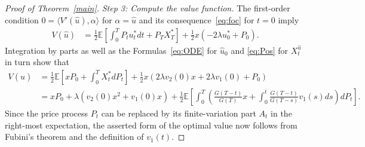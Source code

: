 \documentclass[11pt]{article}
\theoremstyle{definition}
\theoremstyle{remark}
\newcommand{\E}{\mathbb{E}} %
\newcommand{\ts}{\textstyle}
\begin{document}
\begin{proof}[Proof of Theorem~\ref{main}]
\emph{Step 3: Compute the value function.}
The first-order condition $0=\langle V'(\hat{u}), \alpha \rangle$ for $\alpha=\hat{u}$ and its consequence~\eqref{eq:foc} for $t=0$ imply
\begin{align*}
V(\hat{u}) &= \frac{1}{2}\E\left[\int_0^T P_t u^\ast_t dt + P_T X^\ast_T \right] + \frac{1}{2}x(-2\lambda u^\ast_0 + P_0).
\end{align*}
Integration by parts as well as the Formulas~\eqref{eq:ODE} for $\hat{u}_0$ and \eqref{eq:Pos} for $X^{\hat{u}}_t$ in turn show that
\begin{align*}
V(\hat{u}) &=\frac{1}{2}\E\left[xP_0 + \int_0^T X^\ast_t dP_t \right] + \frac{1}{2}x(2\lambda v_2(0)x + 2\lambda v_1(0) + P_0)\\
&= xP_0 + \lambda(v_2(0)x^2+v_1(0)x) + \frac{1}{2}\E\left[\int_0^T \left(\frac{G(T-t)}{G(T)}x + \int_0^t \frac{G(T-t)}{G(T-s)}v_1(s) ds\right) dP_t\right].
\end{align*}
Since the price process $P_t$ can be replaced by its finite-variation part $A_t$ in the right-most expectation, the asserted form of the optimal value now follows from Fubini's theorem and the definition of $v_1(t)$. %

\end{proof}
\end{document}
